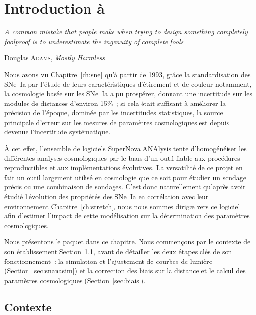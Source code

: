 \documentclass[../main/main.tex]{subfiles}
\begin{document}

\chapter{Introduction \`a \snana}\label{ch:snana}
\epigraph{\openquote\textit{A common mistake that people make when trying to
design something completely foolproof is to underestimate the ingenuity of
complete fools}\closequote}{Douglas \textsc{Adams}, \textit{Mostly Harmless}}

Nous avons vu Chapitre~\ref{ch:sne} qu'à partir de 1993, grâce la
standardisation des SNe~Ia par l'étude de leurs caractéristiques d'étirement et
de couleur notamment, la cosmologie basée sur les SNe~Ia a pu prospérer, donnant
une incertitude sur les modules de distances d'environ 15\%~; si cela était
suffisant à améliorer la précision de l'époque, dominée par les incertitudes
statistiques, la source principale d'erreur sur les mesures de paramètres
cosmologiques est depuis devenue l'incertitude systématique.

À cet effet, l'ensemble de logiciels SuperNova ANAlysis
\citep[\snana,][]{kessler2009a} tente d'homogénéiser les différentes analyses
cosmologiques par le biais d'un outil fiable aux procédures reproductibles et
aux implémentations évolutives. La versatilité de ce projet en fait un outil
largement utilisé en cosmologie \citep[par exemple,][]{kessler2009b, conley2011,
betoule2014, smith2020} que ce soit pour étudier un sondage précis ou une
combinaison de sondages. C'est donc naturellement qu'après avoir étudié
l'évolution des propriétés des SNe~Ia en corrélation avec leur environnement
Chapitre~\ref{ch:stretch}, nous nous sommes dirigæ vers ce logiciel afin
d'estimer l'impact de cette modélisation sur la détermination des paramètres
cosmologiques.

Nous présentons le paquet dans ce chapitre. Nous commençons par le contexte de
son établissement Section~\ref{sec:snanacont}, avant de détailler les deux
étapes clés de son fonctionnement~: la simulation et l'ajustement de courbes de
lumière (Section~\ref{sec:snanasim}) et la correction des biais sur la distance
et le calcul des paramètres cosmologiques (Section~\ref{sec:biais}).

\vfill
\minitoc
\vfill

\newpage

\section{Contexte}\label{sec:snanacont}
\end{document}
